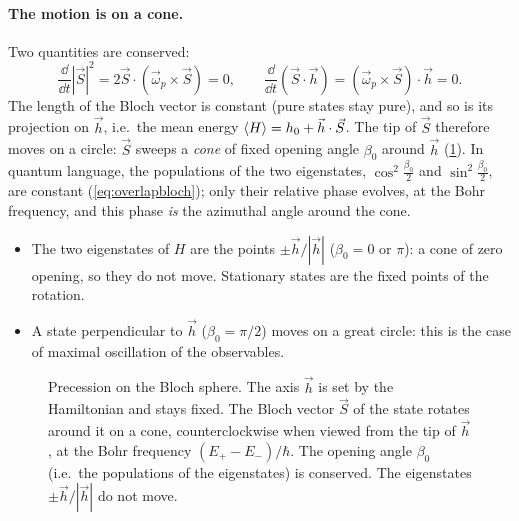 \paragraph{The motion is on a cone.} Two quantities are conserved:
\begin{equation}
  \frac{\dd}{\dd t}|\vec S|^2=2\vec S\cdot(\vec\omega_p\times\vec S)=0,\qquad
  \frac{\dd}{\dd t}(\vec S\cdot\vec h)=(\vec\omega_p\times\vec S)\cdot\vec h=0 .
\end{equation}
The length of the Bloch vector is constant (pure states stay pure), and so is its projection on $\vec h$, i.e.\ the mean energy $\left\langle H\right\rangle=h_0+\vec h\cdot\vec S$. The tip of $\vec S$
therefore moves on a circle: $\vec S$ sweeps a \emph{cone} of fixed opening angle $\beta_0$ around $\vec h$ (\cref{fig:precession}). In quantum language, the populations of the two
eigenstates, $\cos^2\frac{\beta_0}2$ and $\sin^2\frac{\beta_0}2$, are constant (\cref{eq:overlapbloch}); only their relative phase evolves, at the Bohr frequency, and this
phase \emph{is} the azimuthal angle around the cone.
\begin{itemize}
  \item The two eigenstates of $H$ are the points $\pm\vec h/|\vec h|$ ($\beta_0=0$ or $\pi$): a cone of zero opening, so they do not move. Stationary states are the fixed points of the rotation.
  \item A state perpendicular to $\vec h$ ($\beta_0=\pi/2$) moves on a great circle: this is the case of maximal oscillation of the observables.
\end{itemize}

\begin{figure}[h]\centering
{}
\caption{Precession on the Bloch sphere. The axis $\vec h$ is set by the Hamiltonian and stays fixed. The Bloch vector $\vec S$ of the state rotates around it on a cone,
counterclockwise when viewed from the tip of $\vec h$, at the Bohr frequency $(E_+-E_-)/\hbar$. The opening angle $\beta_0$ (i.e.\ the populations of the eigenstates)
is conserved. The eigenstates $\pm\vec h/|\vec h|$ do not move.}\label{fig:precession}
\end{figure}

